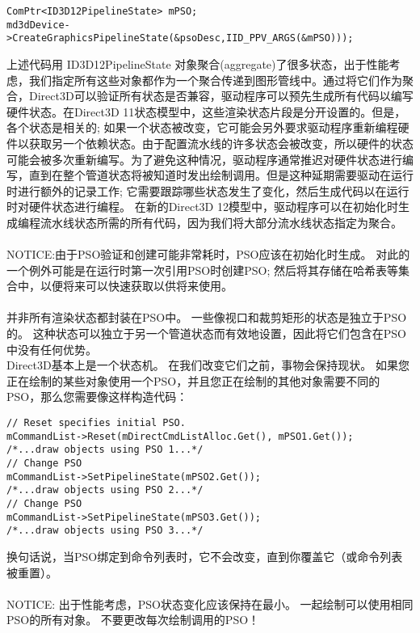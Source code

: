 \begin{flushleft}
\begin{lstlisting}
ComPtr<ID3D12PipelineState> mPSO;
md3dDevice->CreateGraphicsPipelineState(&psoDesc,IID_PPV_ARGS(&mPSO)));
\end{lstlisting}
上述代码用 ID3D12PipelineState 对象聚合(aggregate)了很多状态，出于性能考虑，我们指定所有这些对象都作为一个聚合传递到图形管线中。通过将它们作为聚合，Direct3D可以验证所有状态是否兼容，驱动程序可以预先生成所有代码以编写硬件状态。在Direct3D 11状态模型中，这些渲染状态片段是分开设置的。但是，各个状态是相关的; 如果一个状态被改变，它可能会另外要求驱动程序重新编程硬件以获取另一个依赖状态。由于配置流水线的许多状态会被改变，所以硬件的状态可能会被多次重新编写。为了避免这种情况，驱动程序通常推迟对硬件状态进行编写，直到在整个管道状态将被知道时发出绘制调用。但是这种延期需要驱动在运行时进行额外的记录工作; 它需要跟踪哪些状态发生了变化，然后生成代码以在运行时对硬件状态进行编程。 在新的Direct3D 12模型中，驱动程序可以在初始化时生成编程流水线状态所需的所有代码，因为我们将大部分流水线状态指定为聚合。\\
~\\
NOTICE:由于PSO验证和创建可能非常耗时，PSO应该在初始化时生成。 对此的一个例外可能是在运行时第一次引用PSO时创建PSO; 然后将其存储在哈希表等集合中，以便将来可以快速获取以供将来使用。\\
~\\
并非所有渲染状态都封装在PSO中。 一些像视口和裁剪矩形的状态是独立于PSO的。 这种状态可以独立于另一个管道状态而有效地设置，因此将它们包含在PSO中没有任何优势。\\
Direct3D基本上是一个状态机。 在我们改变它们之前，事物会保持现状。 如果您正在绘制的某些对象使用一个PSO，并且您正在绘制的其他对象需要不同的PSO，那么您需要像这样构造代码：\\
\begin{lstlisting}
// Reset specifies initial PSO.
mCommandList->Reset(mDirectCmdListAlloc.Get(), mPSO1.Get());
/*...draw objects using PSO 1...*/
// Change PSO
mCommandList->SetPipelineState(mPSO2.Get());
/*...draw objects using PSO 2...*/
// Change PSO
mCommandList->SetPipelineState(mPSO3.Get());
/*...draw objects using PSO 3...*/
\end{lstlisting}
换句话说，当PSO绑定到命令列表时，它不会改变，直到你覆盖它（或命令列表被重置）。\\
~\\
NOTICE: 出于性能考虑，PSO状态变化应该保持在最小。 一起绘制可以使用相同PSO的所有对象。 不要更改每次绘制调用的PSO！
\end{flushleft}

